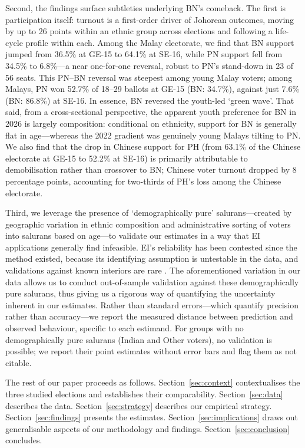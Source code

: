\documentclass[11pt]{article}
\begin{document}
Second, the findings surface subtleties underlying BN's comeback. The first is participation itself: turnout is a first-order driver of Johorean outcomes, moving by up to 26 points within an ethnic group across elections and following a life-cycle profile within each. Among the Malay electorate, we find that BN support jumped from 36.5\% at GE-15 to 64.1\% at SE-16, while PN support fell from 34.5\% to 6.8\%---a near one-for-one reversal, robust to PN's stand-down in 23 of 56 seats. This PN--BN reversal was steepest among young Malay voters; among Malays, PN won 52.7\% of 18--29 ballots at GE-15 (BN: 34.7\%), against just 7.6\% (BN: 86.8\%) at SE-16. In essence, BN reversed the youth-led `green wave'. That said, from a cross-sectional perspective, the apparent youth preference for BN in 2026 is largely composition: conditional on ethnicity, support for BN is generally flat in age---whereas the 2022 gradient was genuinely young Malays tilting to PN. We also find that the drop in Chinese support for PH (from 63.1\% of the Chinese electorate at GE-15 to 52.2\% at SE-16) is primarily attributable to demobilisation rather than crossover to BN; Chinese voter turnout dropped by 8 percentage points, accounting for two-thirds of PH's loss among the Chinese electorate.

Third, we leverage the presence of `demographically pure' salurans---created by geographic variation in ethnic composition and administrative sorting of voters into salurans based on age---to validate our estimates in a way that EI applications generally find infeasible. EI's reliability has been contested since the method existed, because its identifying assumption is untestable in the data\cite{freedman1998,cho1998}, and validations against known interiors are rare \cite{hudson2010,park2014,plesciadesio2018,pavia2022}. The aforementioned variation in our data allows us to conduct out-of-sample validation against these demographically pure salurans, thus giving us a rigorous way of quantifying the uncertainty inherent in our estimates. Rather than standard errors---which quantify precision rather than accuracy---we report the measured distance between prediction and observed behaviour, specific to each estimand. For groups with no demographically pure salurans (Indian and Other voters), no validation is possible; we report their point estimates without error bars and flag them as not citable.

The rest of our paper proceeds as follows. Section~\ref{sec:context} contextualises the three studied elections and establishes their comparability. Section~\ref{sec:data} describes the data. Section~\ref{sec:strategy} describes our empirical strategy. Section~\ref{sec:findings} presents the estimates. Section~\ref{sec:implications} draws out generalisable aspects of our methodology and findings. Section~\ref{sec:conclusion} concludes.
\end{document}
